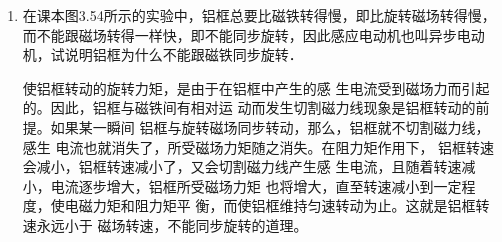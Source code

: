 \begin{enumerate}
    \item 在课本图3.54所示的实验中，铝框总要比磁铁转得慢，即比旋转磁场转得慢，而不能跟磁场转得一样快，即不能同步旋转，因此感应电动机也叫异步电动机，试说明铝框为什么不能跟磁铁同步旋转．

    \begin{solution}
使铝框转动的旋转力矩，是由于在铝框中产生的感
生电流受到磁场力而引起的。因此，铝框与磁铁间有相对运
动而发生切割磁力线现象是铝框转动的前提。如果某一瞬间
铝框与旋转磁场同步转动，那么，铝框就不切割磁力线，感生
电流也就消失了，所受磁场力矩随之消失。在阻力矩作用下，
铝框转速会减小，铝框转速减小了，又会切割磁力线产生感
生电流，且随着转速减小，电流逐步增大，铝框所受磁场力矩
也将增大，直至转速减小到一定程度，使电磁力矩和阻力矩平
衡，而使铝框维持匀速转动为止。这就是铝框转速永远小于
磁场转速，不能同步旋转的道理。 
    \end{solution}
    
\end{enumerate}





